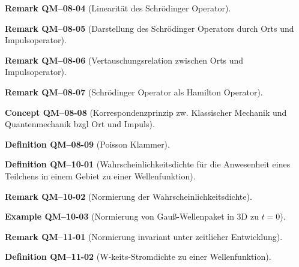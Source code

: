 \documentclass[10pt, letterpaper]{article}
\newcommand{\CustomHeading}[3]{%
  \par\medskip\noindent%
  \textbf{#1 #2} \textnormal{(#3)}.\enskip%
}
\newenvironment{DEF}[2]{\CustomHeading{Definition}{#1}{#2}}{}
\newenvironment{REM}[2]{\CustomHeading{Remark}{#1}{#2}}{}
\newenvironment{EXA}[2]{\CustomHeading{Example}{#1}{#2}}{}
\newenvironment{CONC}[2]{\CustomHeading{Concept}{#1}{#2}}{}
\begin{document}
\begin{REM}{QM--08-04}{Linearität des Schrödinger Operator}
\end{REM}

\begin{REM}{QM--08-05}{Darstellung des Schrödinger Operators durch Orts und Impulsoperator}
\end{REM}

\begin{REM}{QM--08-06}{Vertauschungsrelation zwischen Orts und Impulsoperator}
\end{REM}

\begin{REM}{QM--08-07}{Schrödinger Operator als Hamilton Operator}
\end{REM}

\begin{CONC}{QM--08-08}{Korrespondenzprinzip zw. Klassischer Mechanik und Quantenmechanik bzgl Ort und Impuls}
\end{CONC}

\begin{DEF}{QM--08-09}{Poisson Klammer}
\end{DEF}

\begin{DEF}{QM--10-01}{Wahrscheinlichkeitsdichte für die Anwesenheit eines Teilchens in einem Gebiet zu einer Wellenfunktion}
\end{DEF}

\begin{REM}{QM--10-02}{Normierung der Wahrscheinlichkeitsdichte}
\end{REM}

\begin{EXA}{QM--10-03}{Normierung von Gauß-Wellenpaket in 3D zu $t=0$}
\end{EXA}

\begin{REM}{QM--11-01}{Normierung invariant unter zeitlicher Entwicklung}
\end{REM}

\begin{DEF}{QM--11-02}{W-keits-Stromdichte zu einer Wellenfunktion}
\end{DEF}
\end{document}
